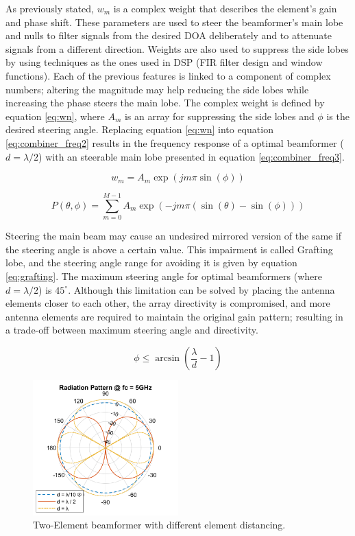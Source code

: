 \documentclass[12pt,a4paper]{report}
\begin{document}
As previously stated, $w_{m}$ is a complex weight that describes the element's gain and phase shift. These parameters are used to steer the beamformer's main lobe and nulls to filter signals from the desired DOA deliberately and to attenuate signals from a different direction. Weights are also used to suppress the side lobes by using techniques as the ones used in DSP (FIR filter design and window functions). Each of the previous features is linked to a component of complex numbers; altering the magnitude may help reducing the side lobes while increasing the phase steers the main lobe. The complex weight is defined by equation \ref{eq:wn}, where $A_{m}$ is an array for suppressing the side lobes and $\phi$ is the desired steering angle. Replacing equation \ref{eq:wn} into equation \ref{eq:combiner_freq2} results in the frequency response of a optimal beamformer ($d = \lambda / 2$) with an steerable main lobe presented in equation \ref{eq:combiner_freq3}.

\begin{equation}
    w_{m} = A_{m} \exp(j m \pi \sin(\phi))
    \label{eq:wn}
\end{equation}

\begin{equation}
P(\theta, \phi) = \sum^{M-1}_{m=0} A_m \exp(-j m \pi (\sin(\theta) - \sin(\phi))) 
\label{eq:combiner_freq3}
\end{equation}

Steering the main beam may cause an undesired mirrored version of the same if the steering angle is above a certain value. This impairment is called Grafting lobe, and the steering angle range for avoiding it is given by equation \ref{eq:grafting}. The maximum steering angle for optimal beamformers (where $d = \lambda/2$) is $45^\circ$. Although this limitation can be solved by placing the antenna elements closer to each other, the array directivity is compromised, and more antenna elements are required to maintain the original gain pattern; resulting in a trade-off between maximum steering angle and directivity.

\begin{equation}
    \phi \leq \arcsin (\frac{\lambda}{d} - 1)
    \label{eq:grafting}
\end{equation}

\begin{figure}[!b]
    \centering
    \includegraphics[width = 0.5\textwidth]{Figures/distance.png}
    \caption{Two-Element beamformer with different element distancing.}
    \label{fig:pattern_distance}
\end{figure}
\end{document}
